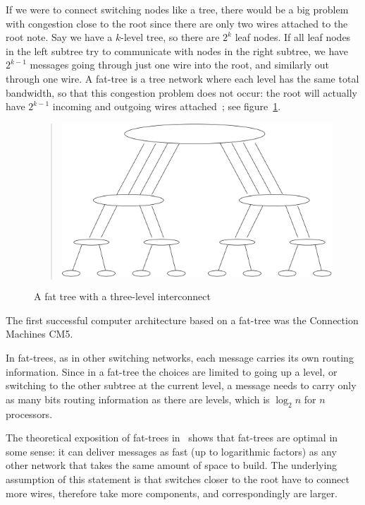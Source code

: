 If we were to connect switching nodes like a tree, there would be a
big problem with congestion close to the root since there are only two
wires attached to the root note.  Say we have a $k$-level tree, so
there are $2^k$ leaf nodes.  If all leaf nodes in the left subtree try
to communicate with nodes in the right subtree, we have $2^{k-1}$
messages going through just one wire into the root, and similarly out
through one wire.  A fat-tree is a tree network where each level has
the same total bandwidth, so that this congestion problem does not
occur: the root will actually have $2^{k-1}$ incoming and outgoing
wires attached~\cite{Greenberg89randomizedrouting}; see
figure~\ref{fig:fattree}.
\begin{figure}
  \begin{quote}
  \includegraphics[scale=.12]{graphics-public/fattree5}
  \end{quote}
  \caption{A fat tree with a three-level interconnect}
  \label{fig:fattree}
\end{figure}
The first successful computer
architecture based on a fat-tree was the Connection Machines CM5.

In fat-trees, as in other switching networks, each message carries its
own routing information. Since in a fat-tree the choices are limited
to going up a level, or switching to the other subtree at the
current level, a message needs to carry only as many bits routing
information as there are levels, which is $\log_2n$ for $n$
processors.

The theoretical exposition of fat-trees in~\cite{Leiserson:fattree}
shows that fat-trees are optimal in some sense: it can deliver
messages as fast (up to logarithmic factors) as any other network that
takes the same amount of space to build. The underlying assumption of
this statement is that switches closer to the root have to connect
more wires, therefore take more components, and correspondingly are
larger. 

